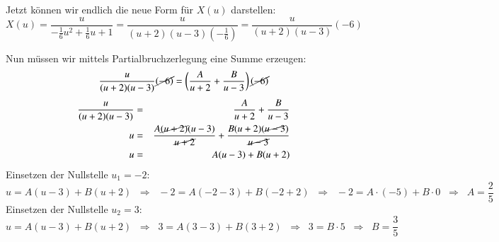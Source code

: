 \begin{uebsp}
\begin{Answer}
\begin{enumerate}[a)]

        Jetzt können wir endlich die neue Form für $X(u)$ darstellen:
        \[X\left(u\right) =
        \frac{u}{-\frac{1}{6}u^2+\frac{1}{6}u+1}=\frac{u}{(u+2)(u-3)\left(-\frac{1}{6}\right)}=\frac{u}{(u+2)(u-3)}\left(-6\right)\]

        Nun müssen wir mittels Partialbruchzerlegung eine Summe erzeugen:
        \[\frac{u}{(u+2)(u-3)}\cancel{\left(-6\right)}=\left(\frac{A}{u+2}+\frac{B}{u-3}\right)\cancel{\left(-6\right)}\]
        \begin{eqnarray*}
            \frac{u}{(u+2)(u-3)}&=&\frac{A}{u+2}+\frac{B}{u-3}\\
            u&=&\frac{A\cancel{(u+2)}(u-3)}{\cancel{u+2}}+\frac{B(u+2)(\cancel{u-3})}{\cancel{u-3}}\\
            u&=&A(u-3)+B(u+2)
        \end{eqnarray*}
        Einsetzen der Nullstelle $u_1=-2$:
        \[u=A(u-3)+B(u+2)\;\;\Rightarrow\;\;-2=A(-2-3)+B(-2+2)\;\;\Rightarrow\;\;-2=A\cdot(-5)+B\cdot0\;\;\Rightarrow\;\;A=\frac{2}{5}\]
        Einsetzen der Nullstelle $u_2=3$:
        \[u=A(u-3)+B(u+2)\;\;\Rightarrow\;\;3=A(3-3)+B(3+2)\;\;\Rightarrow\;\;3=B\cdot
        5\;\;\Rightarrow\;\;B=\frac{3}{5}\]


\end{enumerate}
\end{Answer}
\end{uebsp}
